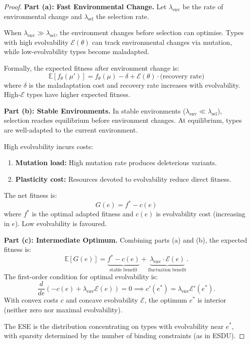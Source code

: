 \documentclass[12pt]{article}
\newcommand{\E}{\mathbb{E}}
\begin{document}
\begin{proof}
\textbf{Part (a): Fast Environmental Change.}
Let $\lambda_{\text{env}}$ be the rate of environmental change and $\lambda_{\text{sel}}$ the selection rate.

When $\lambda_{\text{env}} \gg \lambda_{\text{sel}}$, the environment changes before selection can optimise. Types with high evolvability $\mathcal{E}(\theta)$ can track environmental changes via mutation, while low-evolvability types become maladapted.

Formally, the expected fitness after environment change is:
\[
\E[f_\theta(\mu')] = f_\theta(\mu) - \delta + \mathcal{E}(\theta) \cdot \text{(recovery rate)}
\]
where $\delta$ is the maladaptation cost and recovery rate increases with evolvability. High-$\mathcal{E}$ types have higher expected fitness.

\textbf{Part (b): Stable Environments.}
In stable environments ($\lambda_{\text{env}} \ll \lambda_{\text{sel}}$), selection reaches equilibrium before environment changes. At equilibrium, types are well-adapted to the current environment.

High evolvability incurs costs:
\begin{enumerate}
    \item \textbf{Mutation load:} High mutation rate produces deleterious variants.
    \item \textbf{Plasticity cost:} Resources devoted to evolvability reduce direct fitness.
\end{enumerate}
The net fitness is:
\[
G(e) = f^* - c(e)
\]
where $f^*$ is the optimal adapted fitness and $c(e)$ is evolvability cost (increasing in $e$). Low evolvability is favoured.

\textbf{Part (c): Intermediate Optimum.}
Combining parts (a) and (b), the expected fitness is:
\[
\E[G(e)] = \underbrace{f^* - c(e)}_{\text{stable benefit}} + \underbrace{\lambda_{\text{env}} \cdot \mathcal{E}(e)}_{\text{fluctuation benefit}}.
\]
The first-order condition for optimal evolvability is:
\[
\frac{d}{de} \left( -c(e) + \lambda_{\text{env}} \mathcal{E}(e) \right) = 0 \implies c'(e^*) = \lambda_{\text{env}} \mathcal{E}'(e^*).
\]
With convex costs $c$ and concave evolvability $\mathcal{E}$, the optimum $e^*$ is interior (neither zero nor maximal evolvability).

The ESE is the distribution concentrating on types with evolvability near $e^*$, with sparsity determined by the number of binding constraints (as in ESDU).
\end{proof}
\end{document}
